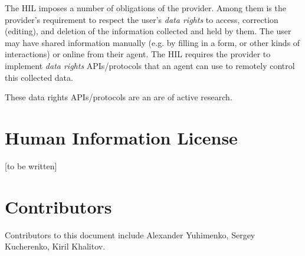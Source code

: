 \documentclass[11pt, oneside]{article}   	%
\begin{document}
The HIL imposes a number of obligations of the provider. Among them is the provider's requirement to respect the user's \emph{data rights} to access, correction (editing), and deletion of the information collected and held by them. The user may have shared information manually (e.g. by filling in a form, or other kinds of interactions) or online from their agent. The HIL requires the provider to implement \emph{data rights} APIs/protocols that an agent can use to remotely control this collected data.

These data rights APIs/protocols are an are of active research.  
    
\section{Human Information License}
[to be written]

\section{Contributors}
Contributors to this document include Alexander Yuhimenko, Sergey Kucherenko, Kiril Khalitov.   



\end{document}
